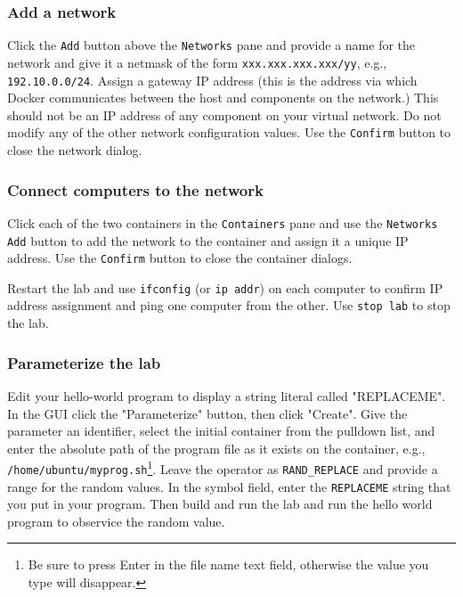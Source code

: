 \documentclass[12pt]{article}
\begin{document}
\subsubsection{Add a network}
Click the {\tt Add} button above the {\tt Networks} pane and provide a name for the network and give it a
netmask of the form {\tt xxx.xxx.xxx.xxx/yy}, e.g., {\tt 192.10.0.0/24}.  Assign a gateway IP address (this is
the address via which Docker communicates between the host and components on the network.)  This should not
be an IP address of any component on your virtual network.  Do not modify any of the other network configuration
values.  Use the {\tt Confirm} button to close the network dialog.

\subsubsection{Connect computers to the network}
Click each of the two containers in the {\tt Containers} pane and use the {\tt Networks} {\tt Add} button to 
add the network to the container and assign it a unique IP address.  Use the {\tt Confirm} button to close the
container dialogs.

Restart the lab and use {\tt ifconfig} (or {\tt ip addr}) on each computer to confirm IP address assignment and ping one computer from
the other.   Use {\tt stop lab} to stop the lab.

\subsubsection{Parameterize the lab}
Edit your hello-world program to display a string literal called "REPLACEME".  
In the GUI click the "Parameterize" button, then click "Create".  Give the parameter an identifier, select the initial
container from the pulldown list, and enter the absolute path of the program file as it exists on the container, e.g.,
{\tt /home/ubuntu/myprog.sh}\footnote{Be sure to press Enter in the file name text field, otherwise the value you type will disappear.}.  Leave the operator as {\tt RAND\_REPLACE} and provide a range for the random values.
In the symbol field, enter the {\tt REPLACEME} string that you put in your program. 
Then build and run the lab and run the hello world program to observice the random value.  
\end{document}
